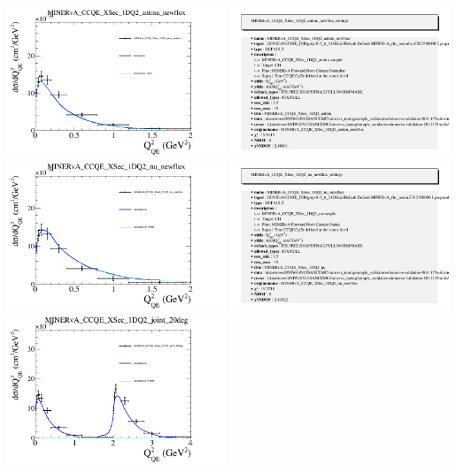 \documentclass{article}
\begin{document}
\centering
\includegraphics[width=0.49\textwidth]{figures/nuisance_MINERvA_CCQE_XSec_1DQ2_antinu_newflux_comp.png}
\includegraphics[width=0.49\textwidth]{figures/nuisance_MINERvA_CCQE_XSec_1DQ2_antinu_newflux_info.png}
\centering
\includegraphics[width=0.49\textwidth]{figures/nuisance_MINERvA_CCQE_XSec_1DQ2_nu_newflux_comp.png}
\includegraphics[width=0.49\textwidth]{figures/nuisance_MINERvA_CCQE_XSec_1DQ2_nu_newflux_info.png}
\centering
\includegraphics[width=0.49\textwidth]{figures/nuisance_MINERvA_CCQE_XSec_1DQ2_joint_20deg_comp.png}
\end{document}

